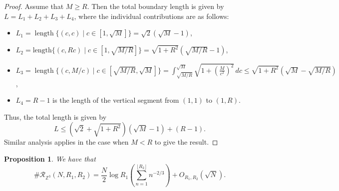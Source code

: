 \documentclass[table]{amsart}
\newtheorem{proposition}[theorem]{Proposition}
\newcommand{\Z}{\mathbb{Z}}
\newcommand{\op}[1]{\operatorname{#1}}
\numberwithin{equation}{section}
\begin{document}
\begin{proof}
Assume that $M \geq R$. Then the total boundary length is given by $
L = L_1 + L_2 + L_3 + L_4$, where the individual contributions are as follows:
\begin{itemize}
    \item $L_1=\op{length}\{(c, c) \mid c \in [1, \sqrt{M}]\} = \sqrt{2}(\sqrt{M} - 1)$,
    \item $
L_2 = \text{length}\{(c, Rc) \mid c \in [1, \sqrt{M/R}]\} = \sqrt{1 + R^2}(\sqrt{M/R} - 1)
$,
\item $
L_3 = \op{length} \{(c, M/c) \mid c \in [\sqrt{M/R}, \sqrt{M}]\} = \int_{\sqrt{M/R}}^{\sqrt{M}} \sqrt{1 + \left( \frac{M}{c^2} \right)^2} \, dc\leq \sqrt{1+R^2}\left(\sqrt{M}-\sqrt{M/R}\right)
$,
\item $L_4=R-1$ is the length of the vertical segment from $(1,1)$ to $(1,R)$.
\end{itemize}
\noindent Thus, the total length is given by
 \[L\leq \left(\sqrt{2}+\sqrt{1+R^2}\right)(\sqrt{M}-1)+(R-1).\]
 \noindent Similar analysis applies in the case when $M<R$ to give the result.
 \end{proof}

\begin{proposition}
We have that
    \[\# \mathcal{R}_{\Z^3}(N, R_1, R_2)= \frac{N}{2}\log R_1\left(\sum_{n=1}^{\lfloor R_2\rfloor}n^{-2/3}\right)+O_{R_1, R_2}(\sqrt{N}). \] 
\end{proposition}
\end{document}
